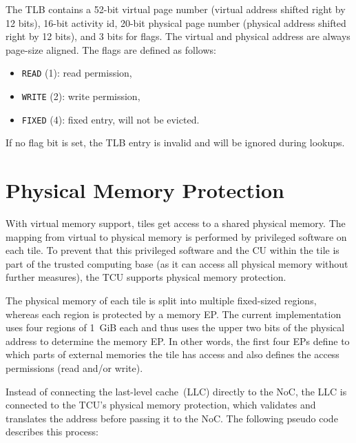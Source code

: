 The TLB contains a 52-bit virtual page number (virtual address shifted right by 12 bits),
\colorbox{tilemux}{16-bit activity id, }20-bit physical page number (physical address shifted right
by 12 bits), and 3 bits for flags. The virtual and physical address are always page-size aligned.
The flags are defined as follows:

\begin{itemize}
  \item \texttt{READ} (1): read permission,
  \item \texttt{WRITE} (2): write permission,
  \item \texttt{FIXED} (4): fixed entry, will not be evicted.
\end{itemize}

If no flag bit is set, the TLB entry is invalid and will be ignored during lookups.

\section{Physical Memory Protection}

\noindent With virtual memory support, tiles get access to a shared physical memory. The mapping from
virtual to physical memory is performed by privileged software on each tile. To prevent that this
privileged software and the CU within the tile is part of the trusted computing base (as it can access
all physical memory without further measures), the TCU supports physical memory protection.

The physical memory of each tile is split into multiple fixed-sized regions, whereas each region is
protected by a memory EP. The current implementation uses four regions of 1~GiB each and thus uses
the upper two bits of the physical address to determine the memory EP. In other words, the first
four EPs define to which parts of external memories the tile has access and also defines the access
permissions (read and/or write).

Instead of connecting the last-level cache~(LLC) directly to the NoC, the LLC is connected to the
TCU's physical memory protection, which validates and translates the address before passing it to
the NoC. The following pseudo code describes this process:\\[.2em]

